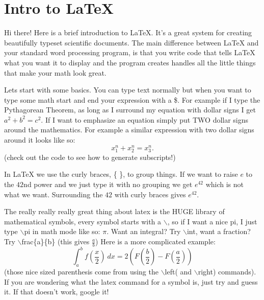 \documentclass[12pt]{article}
\begin{document}
 
%

\rhead{\today}
 
\section{Intro to LaTeX}
Hi there! Here is a brief introduction to LaTeX. It's a great system for creating beautifully typeset scientific documents. The main difference between LaTeX and your standard word processing program, is that you write code that tells LaTeX what you want it to display and the program creates handles all the little things that make your math look great.

Lets start with some basics. You can type text normally but when you want to type some math start and end your expression with a \$. For example if I type the Pythagorean Theorem, as long as I surround my equation with dollar signs I get $a^2 +b^2 = c^2$. If I want to emphasize an equation simply put TWO dollar signs around the mathematics. For example a similar expression with two dollar signs around it looks like so: $$x_1^n + x_2^n = x_3^n.$$ (check out the code to see how to generate subscripts!)

In LaTeX we use the curly braces, \{ \}, to group things. If we want to raise $e$ to the $42$nd power and we just type it with no grouping we get $e^42$ which is not what we want. Surrounding the $42$ with curly braces gives $e^{42}$.

The really really really great thing about latex is the HUGE library of mathematical symbols, every symbol starts with a $\backslash$, so if I want a nice pi, I just type $\backslash$pi in math mode like so: $\pi$. Want an integral? Try $\backslash$int, want a fraction? Try $\backslash$frac\{a\}\{b\} (this gives $\frac{a}{b}$) Here is a more complicated example:
$$
\int_a^b f \left(\frac{x}{2} \right) \ dx =2\left( F\left(\frac{b}{2} \right) - F\left(\frac{a}{2}\right) \right)
$$
(those nice sized parenthesis come from using the $\backslash$left( and $\backslash$right) commands). If you are wondering what the latex command for a symbol is, just try and guess it. If that doesn't work, google it!
\end{document}
